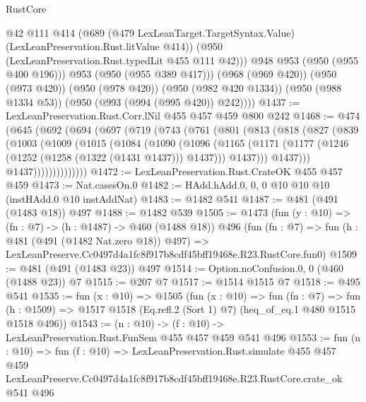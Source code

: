 \begin{lexlean}{RustCore}
\begin{coremodule}
              @42
              @111
              @414
              (@689
                (@479 LexLeanTarget.TargetSyntax.Value)
                (LexLeanPreservation.Rust.litValue @414))
              (@950 (LexLeanPreservation.Rust.typedLit @455 @111 @42)))
            @948
            @953
            (@950 (@955 @400 @196)))
          @953
          (@950 (@955 @389 @417)))
        (@968 (@969 @420))
        (@950 (@973 @420))
        (@950 (@978 @420))
        (@950 (@982 @420 @1334))
        (@950 (@988 @1334 @53))
        (@950 (@993 (@994 (@995 @420)) @242))))
@1437 := LexLeanPreservation.Rust.Corr.lNil @455 @457 @459 @800 @242
@1468 := @474
    (@645
      (@692
        (@694
          (@697
            (@719
              (@743
                (@761
                  (@801
                    (@813
                      (@818
                        (@827
                          (@839
                            (@1003
                              (@1009
                                (@1015
                                  (@1084
                                    (@1090
                                      (@1096
                                        (@1165
                                          (@1171
                                            (@1177
                                              (@1246 (@1252 (@1258 (@1322 (@1431 @1437))) @1437)))
                                            @1437)))
                                      @1437)))
                                @1437))))))))))))))
@1472 := LexLeanPreservation.Rust.CrateOK @455 @457 @459
@1473 := Nat.casesOn.{0}
@1482 := HAdd.hAdd.{0, 0, 0} @10 @10 @10 (instHAdd.{0} @10 instAddNat)
@1483 := @1482 @541
@1487 := @481 (@491 (@1483 @18)) @497
@1488 := @1482 @539
@1505 := @1473
    (fun (y : @10) => (fn : @7) -> (h : @1487) -> @460 (@1488 @18))
    @496
    (fun (fn : @7) =>
    fun (h : @481 (@491 (@1482 Nat.zero @18)) @497) =>
    LexLeanPreserve.Cc0497d4a1fc8f917b8cdf45bff19468e.R23.RustCore.fun0)
@1509 := @481 (@491 (@1483 @23)) @497
@1514 := Option.noConfusion.{0, 0} (@460 (@1488 @23)) @7
@1515 := @207 @7
@1517 := @1514 @1515 @7
@1518 := @495 @541
@1535 := fun (x : @10) =>
  @1505
    (fun (x : @10) =>
    fun (fn : @7) =>
    fun (h : @1509) => @1517 @1518 (Eq.refl.{2} (Sort 1) @7) (heq_of_eq.{1} @480 @1515 @1518 @496))
@1543 := (n : @10) -> (f : @10) -> LexLeanPreservation.Rust.FunSem @455 @457 @459 @541 @496
@1553 := fun (n : @10) =>
  fun (f : @10) =>
  LexLeanPreservation.Rust.simulate
    @455
    @457
    @459
    LexLeanPreserve.Cc0497d4a1fc8f917b8cdf45bff19468e.R23.RustCore.crate_ok
    @541
    @496
\end{coremodule}
\end{lexlean}

